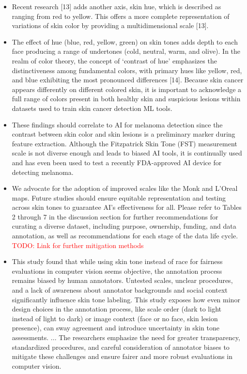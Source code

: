 \documentclass[12pt, a4paper, oneside]{book}   	%
\renewcommand{\todo}[1]{\textcolor{red}{TODO: #1}}
\newif\ifrawcitationactive
\newcommand{\rawcitationend}{\color{black}\rawcitationactivefalse}
\begin{document}
\begin{itemize}
			\item Recent research [13] adds another axis, skin hue, which is described as ranging from red to yellow. This offers a more complete representation of variations of skin color by providing a multidimensional scale [13]. \autocite{Montoya_2025}
			\item The effect of hue (blue, red, yellow, green) on skin tones adds depth to each face producing a range of undertones (cold, neutral, warm, and olive). In the realm of color theory, the concept of ‘contrast of hue’ emphasizes the distinctiveness among fundamental colors, with primary hues like yellow, red, and blue exhibiting the most pronounced differences [14]. Because skin cancer appears differently on different colored skin, it is important to acknowledge a full range of colors present in both healthy skin and suspicious lesions within datasets used to train skin cancer detection ML tools. \autocite{Montoya_2025}
			\item These findings should correlate to AI for melanoma detection since the contrast between skin color and skin lesions is a preliminary marker during feature extraction. Although the Fitzpatrick Skin Tone (FST) measurement scale is not diverse enough and leads to biased AI tools, it is continually used and has even been used to test a recently FDA-approved AI device for detecting melanoma. \autocite{Montoya_2025}
			\item We advocate for the adoption of improved scales like the Monk and L’Oreal maps. Future studies should ensure equitable representation and testing across skin tones to guarantee AI’s effectiveness for all. Please refer to Tables 2 through 7 in the discussion section for further recommendations for curating a diverse dataset, including purpose, ownership, funding, and data annotation, as well as recommendations for each stage of the data life cycle. \autocite{Montoya_2025} \todo{Link for further mitigation methods}
			\item This study found that while using skin tone instead of race for fairness evaluations in computer vision seems objective, the annotation process remains biased by human annotators. Untested scales, unclear procedures, and a lack of awareness about annotator backgrounds and social context significantly influence skin tone labeling. This study exposes how even minor design choices in the annotation process, like scale order (dark to light instead of light to dark) or image context (face or no face, skin lesion presence), can sway agreement and introduce uncertainty in skin tone assessments. ... The researchers emphasize the need for greater transparency, standardized procedures, and careful consideration of annotator biases to mitigate these challenges and ensure fairer and more robust evaluations in computer vision. \autocite{Montoya_2025}
		\end{itemize}
	\rawcitationend
	
\end{document}
